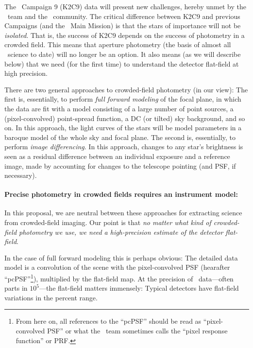 \documentclass[12pt,preprint]{aastex}
\begin{document}
The \ktwo\ Campaign 9 (K2C9) data will present new challenges, hereby
unmet by the \ktwo\ team and the \kepler\ community.
The critical difference between K2C9 and previous Campaigns (and the
\kepler\ Main Mission) is that the stars of importance will not be
\emph{isolated}.
That is, the success of K2C9 depends on the success of photometry in a
crowded field.
This means that aperture photometry (the basis of almost all
\kepler\ science to date) will no longer be an option.
It also means (as we will describe below) that we need (for the first
time) to understand the detector flat-field at high precision.

There are two general approaches to crowded-field photometry (in our view):
The first is, essentially, to perform \emph{full forward modeling} of the
focal plane, in which the data are fit with a model consisting of a
large number of point sources, a (pixel-convolved) point-spread
function, a DC (or tilted) sky background, and so on.
In this approach, the light curves of the stars will be model parameters
in a baroque model of the whole sky and focal plane.
The second is, essentially, to perform \emph{image differencing}.
In this approach, changes to any star's brightness is seen as a
residual difference between an individual exposure and a reference
image, made by accounting for changes to the telescope pointing (and
PSF, if necessary).

\paragraph{Precise photometry in crowded fields requires an instrument model:}

In this proposal, we are neutral between these approaches for extracting
science from crowded-field imaging.
Our point is that \emph{no matter what kind of crowded-field photometry
we use, we need a high-precision estimate of the detector flat-field}.

In the case of full forward modeling this is perhaps obvious:
The detailed data model is a convolution of the scene with the
pixel-convolved PSF (hearafter ``pcPSF''\footnote{From here on, all references to the
  ``pcPSF'' should be read as ``pixel-convolved PSF'' or what the
  \kepler\ team sometimes calls the ``pixel response function'' or
  PRF.}), multiplied by the flat-field map.
At the precision of \kepler\ data---often parts in $10^5$---the
flat-field matters immensely:
Typical detectors have flat-field variations in the percent range.
\end{document}
